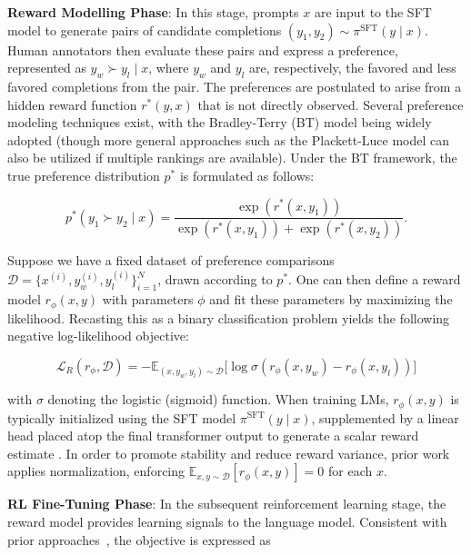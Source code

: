 \textbf{Reward Modelling Phase}: In this stage, prompts $x$ are input to the SFT model to generate pairs of candidate completions $(y_1, y_2)\sim \pi^\text{SFT}(y \mid x)$. Human annotators then evaluate these pairs and express a preference, represented as $y_w\succ y_l \mid x$, where $y_w$ and $y_l$ are, respectively, the favored and less favored completions from the pair. The preferences are postulated to arise from a hidden reward function $r^*(y, x)$ that is not directly observed. Several preference modeling techniques exist, with the Bradley-Terry (BT) \cite{bradley1952rankanalysis} model being widely adopted (though more general approaches such as the Plackett-Luce model \citep{plackett1975analysis, luce2012individual} can also be utilized if multiple rankings are available). Under the BT framework, the true preference distribution $p^*$ is formulated as follows:

\begin{equation}\label{eq:bradley-terry}
    p^*(y_1\succ y_2 \mid x)=\frac{\exp\left(r^*(x, y_1)\right)}{\exp\left(r^*(x, y_1)\right) + \exp\left(r^*(x, y_2)\right)}.
\end{equation}

Suppose we have a fixed dataset of preference comparisons $\mathcal{D}=\bigl\{x^{(i)}, y_w^{(i)}, y_l^{(i)}\bigr\}_{i=1}^N$, drawn according to $p^*$. One can then define a reward model $r_{\phi}(x, y)$ with parameters $\phi$ and fit these parameters by maximizing the likelihood. Recasting this as a binary classification problem yields the following negative log-likelihood objective:

\begin{equation}\label{eq:reward_model}
    \mathcal{L}_R(r_{\phi}, \mathcal{D}) = -\mathbb{E}_{(x, y_w, y_l)\sim \mathcal{D}}\bigl[\log \sigma(r_{\phi}(x, y_w)- r_{\phi}(x, y_l))\bigr]
\end{equation}

with $\sigma$ denoting the logistic (sigmoid) function. When training LMs, $r_{\phi}(x, y)$ is typically initialized using the SFT model $\pi^\text{SFT}(y \mid x)$, supplemented by a linear head placed atop the final transformer output to generate a scalar reward estimate \cite{ziegler2020finetuning}. In order to promote stability and reduce reward variance, prior work applies normalization, enforcing $\mathbb{E}_{x,y\sim \mathcal{D}}\left[r_\phi(x, y)\right] = 0$ for each $x$.

\textbf{RL Fine-Tuning Phase}: In the subsequent reinforcement learning stage, the reward model provides learning signals to the language model. Consistent with prior approaches~\citep{jaques2017sequence, jaques2020human}, the objective is expressed as

